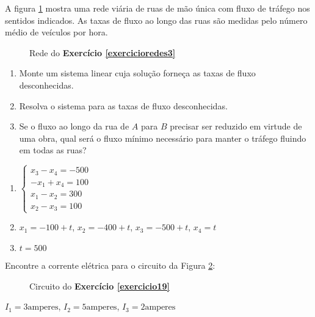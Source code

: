 \documentclass[12pt]{exam}
\begin{document}
\begin{exercicio}\label{exercicioredes3}
  A figura \ref{exercicio3redesanton} mostra uma rede viária de ruas de mão única com fluxo de tráfego nos sentidos indicados. As taxas
  de fluxo ao longo das ruas são medidas pelo número médio de veículos por hora.
  \begin{figure}[!h]
  	\centering
  	
    \caption{Rede do \textbf{Exercício \ref{exercicioredes3}}}
    \label{exercicio3redesanton}
  \end{figure}

  \begin{enumerate}
    \item Monte um sistema linear cuja solução forneça as taxas de fluxo desconhecidas.
    \item Resolva o sistema para as taxas de fluxo desconhecidas.
    \item Se o fluxo ao longo da rua de $A$ para $B$ precisar ser reduzido em virtude de uma obra, qual será o fluxo mínimo necessário para manter o tráfego fluindo em todas as ruas?
  \end{enumerate}
  \begin{solucao}
    \begin{enumerate}
      \item $\begin{cases}x_3 - x_4 = -500\\-x_1 + x_4 = 100\\x_1 - x_2 = 300\\x_2 - x_3 = 100\end{cases}$
      \item $x_1 = -100 +t$, $x_2 = -400 + t$, $x_3 = -500 + t$, $x_4 = t$
      \item $t = 500$
    \end{enumerate}
  \end{solucao}
\end{exercicio}

\begin{exercicio}\label{exercicio19}
  Encontre a corrente elétrica para o circuito da Figura \ref{exercicio19circuitopoole}:
    \begin{figure}[!h]
      \centering
      
      \caption{Circuito do \textbf{Exercício \ref{exercicio19}}}
    \label{exercicio19circuitopoole}
    \end{figure}

  \begin{solucao}
    $I_1 = 3 \mbox{amperes}$,
    $I_2 = 5 \mbox{amperes}$,
    $I_3 = 2 \mbox{amperes}$
  \end{solucao}
\end{exercicio}
\end{document}
